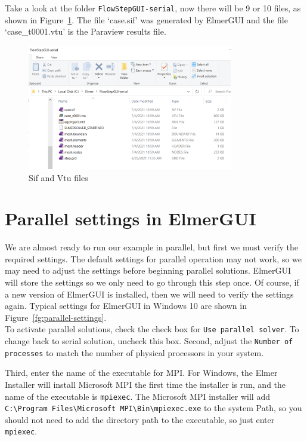 \newpage

Take a look at the folder \texttt{FlowStepGUI-serial}, now there will be 9 or 10 files, as shown in Figure~\ref{fg:results}.  The file `case.sif' was generated by ElmerGUI and the file `case\_t0001.vtu' is the Paraview results file.

\begin{figure}[H]
\centering
\includegraphics[width=0.8\textwidth]{serial-15}
\caption{Sif and Vtu files}\label{fg:results}
\end{figure}

\section{Parallel settings in ElmerGUI}

We are almost ready to run our example in parallel, but first we must verify the required settings.  The default settings for parallel operation may not work, so we may need to adjust the settings before beginning parallel solutions.  ElmerGUI will store the settings so we only need to go through this step once.  Of course, if a new version of ElmerGUI is installed, then we will need to verify the settings again.  Typical settings for ElmerGUI in Windows 10 are shown in Figure~\ref{fg:parallel-settings}.\\

To activate parallel solutions, check the check box for \texttt{Use parallel solver}.  To change back to serial solution, uncheck this box.  Second, adjust the \texttt{Number of processes} to match the number of physical processors in your system.

Third, enter the name of the executable for MPI.  For Windows, the Elmer Installer will install Microsoft MPI the first time the installer is run, and the name of the executable is \texttt{mpiexec}.  The Microsoft MPI installer will add  \texttt{C:\textbackslash{}Program Files\textbackslash{}Microsoft MPI\textbackslash{}Bin\textbackslash{}mpiexec.exe} to the system Path, so you should not need to add the directory path to the executable, so just enter \texttt{mpiexec}.


